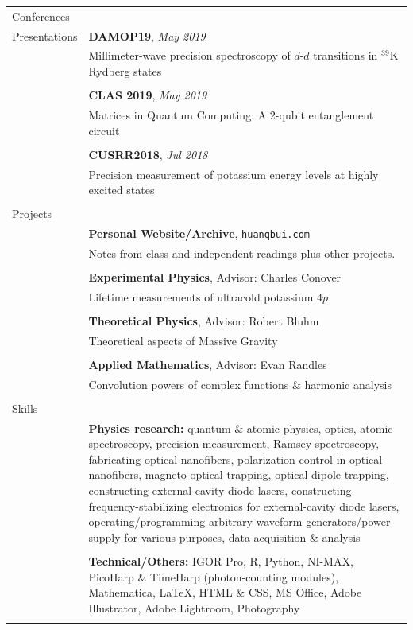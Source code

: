 \documentclass[10pt]{article}
\begin{document}
\begin{longtable}{ l m{13.5cm}   }
  \large{Conferences}   & \\
  \large{Presentations}	& \textbf{DAMOP19}, \textit{May 2019} \\
  						& Millimeter-wave precision spectroscopy of $d$-$d$ transitions in $^{\text{39}}$K Rydberg states\\
  						& \\
  						& \textbf{CLAS 2019}, \textit{May 2019}\\
  						& Matrices in Quantum Computing: A 2-qubit entanglement circuit\\
  						&\\
  						& \textbf{CUSRR2018}, \textit{Jul 2018}\\
  						& Precision measurement of potassium energy levels at highly excited states\\
  	 					& \\ 
 

  \large{Projects}		& \\ 
  						& \textbf{Personal Website/Archive}, \href{https://huanqbui.com}{\texttt{huanqbui.com}} \\
  						& Notes from class and independent readings plus other projects.\\
  						& \\
  
  						& \textbf{Experimental Physics}, Advisor: Charles Conover \\
  						& Lifetime measurements of ultracold potassium $4p$\\
  						& \\
  						 
  						& \textbf{Theoretical Physics}, Advisor: Robert Bluhm\\
  						& Theoretical aspects of Massive Gravity\\
  						& \\
  						 
  						& \textbf{Applied Mathematics}, Advisor: Evan Randles\\
  						& Convolution powers of complex functions \& harmonic analysis\\
  						& \\
  						 
  						 
  \large{Skills}      	& \\ 
  						& \textbf{Physics research:} quantum \& atomic physics, optics, atomic spectroscopy, precision measurement, Ramsey spectroscopy, fabricating optical nanofibers, polarization control in optical nanofibers, magneto-optical trapping, optical dipole trapping, constructing external-cavity diode lasers, constructing frequency-stabilizing electronics for external-cavity diode lasers, operating/programming arbitrary waveform generators/power supply for various purposes, data acquisition \& analysis \\
  						& \\
  						& \textbf{Technical/Others:} IGOR Pro, R, Python, NI-MAX, PicoHarp \& TimeHarp (photon-counting modules),  Mathematica, \LaTeX{}, HTML \& CSS, MS Office,  Adobe Illustrator, Adobe Lightroom, Photography \\ 
  						& \\
  						 

\end{longtable}
\end{document}
